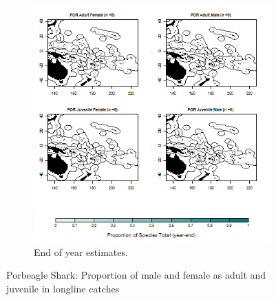 \documentclass[12pt]{SCreport}
\begin{document}
\begin{landscape}
\begin{figure}
\begin{subfigure}[b]{0.6\textwidth}
       \includegraphics[width=\textwidth]{../GRAPHICS/Defined/BI_29_Map_maturity_sex_POR}
       \caption{End of year estimates.}
       \label{fig:test2}
   \end{subfigure}
\caption{Porbeagle Shark: Proportion of male and female as adult and juvenile in longline catches }
\label{fig:test} 
\end{figure}
\end{landscape}
\end{document}
